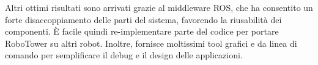 Altri ottimi risultati sono arrivati grazie al middleware ROS, che ha consentito un forte disaccoppiamento delle parti del sistema, favorendo la riusabilità dei componenti. È facile quindi re-implementare parte del codice per portare RoboTower su altri robot. Inoltre, fornisce  moltissimi tool grafici e da linea di comando per semplificare il debug e il design delle applicazioni. 


